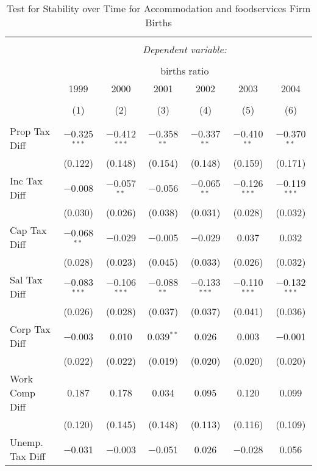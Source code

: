 
\begin{table}[!htbp] \centering 
  \caption{Test for Stability over Time for  Accommodation and foodservices Firm Births} 
  \label{72year} 
\small 
\begin{tabular}{@{\extracolsep{5pt}}lcccccc} 
\\[-1.8ex]\hline 
\hline \\[-1.8ex] 
 & \multicolumn{6}{c}{\textit{Dependent variable:}} \\ 
\cline{2-7} 
\\[-1.8ex] & \multicolumn{6}{c}{births ratio} \\ 
 & 1999 & 2000 & 2001 & 2002 & 2003 & 2004 \\ 
\\[-1.8ex] & (1) & (2) & (3) & (4) & (5) & (6)\\ 
\hline \\[-1.8ex] 
 Prop Tax Diff & $-$0.325$^{***}$ & $-$0.412$^{***}$ & $-$0.358$^{**}$ & $-$0.337$^{**}$ & $-$0.410$^{**}$ & $-$0.370$^{**}$ \\ 
  & (0.122) & (0.148) & (0.154) & (0.148) & (0.159) & (0.171) \\ 
  Inc Tax Diff & $-$0.008 & $-$0.057$^{**}$ & $-$0.056 & $-$0.065$^{**}$ & $-$0.126$^{***}$ & $-$0.119$^{***}$ \\ 
  & (0.030) & (0.026) & (0.038) & (0.031) & (0.028) & (0.032) \\ 
  Cap Tax Diff & $-$0.068$^{**}$ & $-$0.029 & $-$0.005 & $-$0.029 & 0.037 & 0.032 \\ 
  & (0.028) & (0.023) & (0.045) & (0.033) & (0.026) & (0.032) \\ 
  Sal Tax Diff & $-$0.083$^{***}$ & $-$0.106$^{***}$ & $-$0.088$^{**}$ & $-$0.133$^{***}$ & $-$0.110$^{***}$ & $-$0.132$^{***}$ \\ 
  & (0.026) & (0.028) & (0.037) & (0.037) & (0.041) & (0.036) \\ 
  Corp Tax Diff & $-$0.003 & 0.010 & 0.039$^{**}$ & 0.026 & 0.003 & $-$0.001 \\ 
  & (0.022) & (0.022) & (0.019) & (0.020) & (0.020) & (0.020) \\ 
  Work Comp Diff & 0.187 & 0.178 & 0.034 & 0.095 & 0.120 & 0.099 \\ 
  & (0.120) & (0.145) & (0.148) & (0.113) & (0.116) & (0.109) \\ 
  Unemp. Tax Diff & $-$0.031 & $-$0.003 & $-$0.051 & 0.026 & $-$0.028 & 0.056 \\ 

\end{tabular}
\end{table}
